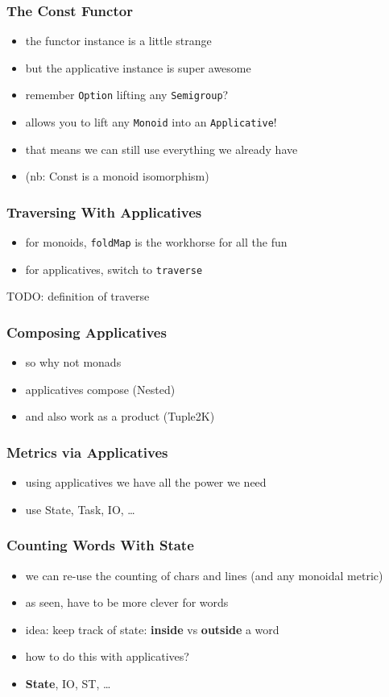 \documentclass[aspectratio=169]{beamer}
\begin{document}
\begin{frame}
  \frametitle{The Const Functor}
  \begin{itemize}
  \item the functor instance is a little strange
  \item but the applicative instance is super awesome
  \item remember \texttt{Option} lifting any \texttt{Semigroup}?
  \item allows you to lift any \texttt{Monoid} into an \texttt{Applicative}!
  \item that means we can still use everything we already have
  \item (nb: Const is a monoid isomorphism)
  \end{itemize}
\end{frame}

\begin{frame}
  \frametitle{Traversing With Applicatives}
  \begin{itemize}
  \item for monoids, \texttt{foldMap} is the workhorse for all the fun
  \item for applicatives, switch to \texttt{traverse}
  \end{itemize}
  TODO: definition of traverse
\end{frame}

\begin{frame}
  \frametitle{Composing Applicatives}
  \begin{itemize}
  \item so why not monads
  \item applicatives compose (Nested)
  \item and also work as a product (Tuple2K)
  \end{itemize}
\end{frame}

\begin{frame}
  \frametitle{Metrics via Applicatives}
  \begin{itemize}
  \item using applicatives we have all the power we need
  \item use State, Task, IO, \ldots
  \end{itemize}
\end{frame}

\begin{frame}
  \frametitle{Counting Words \textemdash{} With State}
  \begin{itemize}
  \item we can re-use the counting of chars and lines (and any monoidal metric)
  \item as seen, have to be more clever for words
  \item idea: keep track of state: \textbf{inside} vs \textbf{outside} a word
  \item how to do this with applicatives?
  \item \textbf{State}, IO, ST, \ldots{}
  \end{itemize}
\end{frame}
\end{document}
